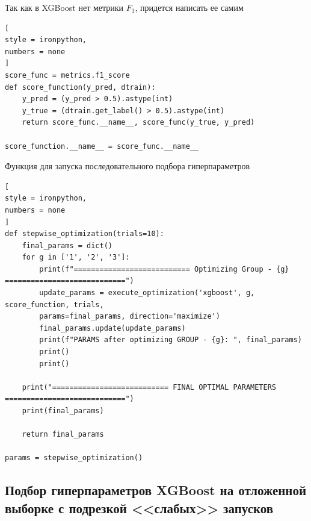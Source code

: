 \documentclass[%
	11pt,
	a4paper,
	utf8,
		]{article}
\begin{document}
Так как в XGBoost нет метрики $ F_1 $, придется написать ее самим
\begin{lstlisting}[
style = ironpython,
numbers = none
]
score_func = metrics.f1_score
def score_function(y_pred, dtrain):
	y_pred = (y_pred > 0.5).astype(int)
	y_true = (dtrain.get_label() > 0.5).astype(int)
	return score_func.__name__, score_func(y_true, y_pred)

score_function.__name__ = score_func.__name__
\end{lstlisting}

Функция для запуска последовательного подбора гиперпараметров
\begin{lstlisting}[
style = ironpython,
numbers = none
]
def stepwise_optimization(trials=10):
	final_params = dict()
	for g in ['1', '2', '3']:
		print(f"=========================== Optimizing Group - {g} ============================")
		update_params = execute_optimization('xgboost', g, score_function, trials,
		params=final_params, direction='maximize')
		final_params.update(update_params)
		print(f"PARAMS after optimizing GROUP - {g}: ", final_params)
		print()
		print()

	print("=========================== FINAL OPTIMAL PARAMETERS ============================")
	print(final_params)

	return final_params
	
params = stepwise_optimization()
\end{lstlisting}


\subsection{Подбор гиперпараметров XGBoost на отложенной выборке с подрезкой <<слабых>> запусков}
\end{document}
